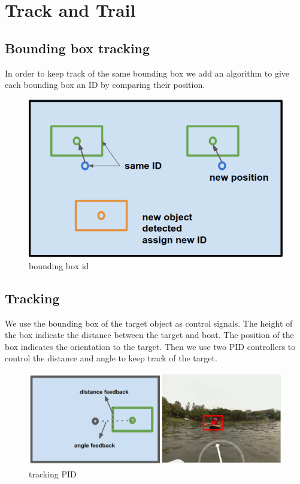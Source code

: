 \section{Track and Trail}

\subsection{Bounding box tracking}

In order to keep track of the same bounding box we add an algorithm to give each bounding box an ID by comparing their position.

\begin{figure}[H]
    \includegraphics[width=1\columnwidth]{images/bbox.png}
    \centering
    \caption{bounding box id}
    \label{figure:bbox}
\end{figure}

\subsection{Tracking}

We use the bounding box of the target object as control signals. The height of the box indicate the distance between the target and boat. The position of the box indicates the orientation to the target. Then we use two PID controllers to control the distance and angle to keep track of the target.

\begin{figure}[H]
    \includegraphics[width=1\columnwidth]{images/tracking.png}
    \centering
    \caption{tracking PID}
    \label{figure:tracking}
\end{figure}
